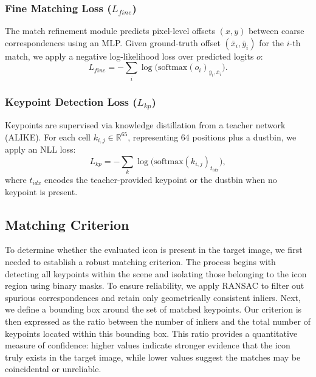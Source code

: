 \subsubsection{Fine Matching Loss ($L_{fine}$)}
The match refinement module predicts pixel-level offsets $(x,y)$ between coarse correspondences using an MLP.
Given ground-truth offset $(\bar{x}_i, \bar{y}_i)$ for the $i$-th match, we apply a negative log-likelihood loss over predicted logits $o$:
\begin{equation}
    L_{fine} = - \sum_i \log \big( \text{softmax}(o_i)_{\bar{y}_i, \bar{x}_i} \big).
\end{equation}

\subsubsection{Keypoint Detection Loss ($L_{kp}$)}
Keypoints are supervised via knowledge distillation from a teacher network (ALIKE).
For each cell $k_{i,j} \in \mathbb{R}^{65}$, representing 64 positions plus a dustbin, we apply an NLL loss:
\begin{equation}
    L_{kp} = - \sum_k \log \big( \text{softmax}(k_{i,j})_{t_{idx}} \big),
\end{equation}
where $t_{idx}$ encodes the teacher-provided keypoint or the dustbin when no keypoint is present.

\medskip
\subsection{Matching Criterion}
To determine whether the evaluated icon is present in the target image, we first needed to establish a robust matching criterion. The process begins with detecting all keypoints within the scene and isolating those belonging to the icon region using binary masks. To ensure reliability, we apply RANSAC to filter out spurious correspondences and retain only geometrically consistent inliers. Next, we define a bounding box around the set of matched keypoints. Our criterion is then expressed as the ratio between the number of inliers and the total number of keypoints located within this bounding box. This ratio provides a quantitative measure of confidence: higher values indicate stronger evidence that the icon truly exists in the target image, while lower values suggest the matches may be coincidental or unreliable.
